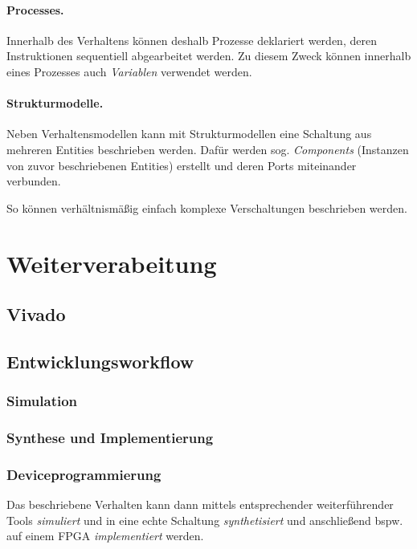 \paragraph{Processes.} Innerhalb des Verhaltens können deshalb Prozesse deklariert werden, deren Instruktionen sequentiell abgearbeitet werden. Zu diesem Zweck können innerhalb eines Prozesses auch \textit{Variablen} verwendet werden.

\paragraph{Strukturmodelle.} Neben Verhaltensmodellen kann mit Strukturmodellen eine Schaltung aus mehreren Entities beschrieben werden. Dafür werden sog. \textit{Components} (Instanzen von zuvor beschriebenen Entities) erstellt und deren Ports miteinander verbunden.

So können verhältnismäßig einfach komplexe Verschaltungen beschrieben werden.
 
\section{Weiterverabeitung}
\subsection{Vivado}
\subsection{Entwicklungsworkflow}
\subsubsection{Simulation}
\subsubsection{Synthese und Implementierung}
\subsubsection{Deviceprogrammierung}
Das beschriebene Verhalten kann dann mittels entsprechender weiterführender Tools \textit{simuliert} und in eine echte Schaltung \textit{synthetisiert} und anschließend bspw. auf einem FPGA \textit{implementiert} werden.
